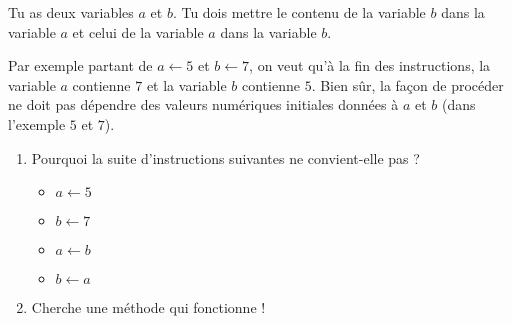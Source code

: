 \documentclass[class=report,crop=false, 12pt]{standalone}
\begin{document}
\begin{activite}
Tu as deux variables $a$ et $b$. Tu dois mettre le contenu de la variable $b$ dans la variable $a$ et celui de la variable $a$ dans la variable $b$.

Par exemple partant de $a \leftarrow 5$ et $b \leftarrow 7$, on veut qu'à la fin des instructions, la variable $a$ contienne $7$ et la variable $b$ contienne $5$. Bien sûr, la façon de procéder ne doit pas dépendre des valeurs numériques initiales données à $a$ et $b$ (dans l'exemple $5$ et $7$).

\begin{enumerate}
  \item Pourquoi la suite d'instructions suivantes ne convient-elle pas ?
\begin{itemize}
  \item $a \leftarrow 5$
  \item $b \leftarrow 7$
  \item $a \leftarrow b$ 
  \item $b \leftarrow a$ 
\end{itemize}
  
  \item Cherche une méthode qui fonctionne !
\end{enumerate}
\end{activite}
\end{document}
